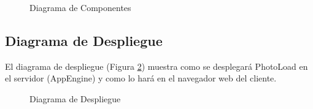 \documentclass{scrartcl}
\begin{document}
\begin{figure}[H]
	
	\centering
	\caption{Diagrama de Componentes}
	\label{fig:DiagramaComponentes}
	
\end{figure}

\subsection{Diagrama de Despliegue}
El diagrama de despliegue (Figura \ref{fig:DiagramaDespliegue}) muestra como se desplegará PhotoLoad en el servidor (AppEngine) y como lo hará en el navegador web del cliente.

\begin{figure}[H]
	
	\centering
	\caption{Diagrama de Despliegue}
	\label{fig:DiagramaDespliegue}
	
\end{figure}
\end{document}
